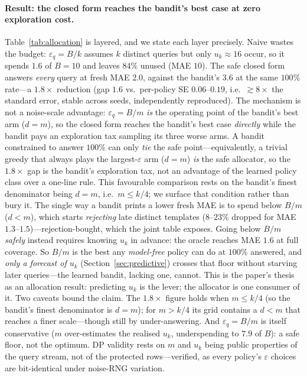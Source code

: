 \documentclass[sigconf,nonacm]{acmart}
\newcommand{\eps}{\varepsilon}
\begin{document}
\paragraph{Result: the closed form reaches the bandit's best case at zero exploration cost.} Table~\ref{tab:allocation} is layered, and we state each layer precisely. Naive wastes the budget: $\eps_q=B/k$ assumes $k$ distinct queries but only $u_k\approx16$ occur, so it spends $1.6$ of $B=10$ and leaves $84\%$ unused (MAE $10$). The safe closed form answers \emph{every} query at fresh MAE $2.0$, against the bandit's $3.6$ at the same $100\%$ rate---a $1.8\times$ reduction (gap $1.6$ vs.\ per-policy SE $0.06$--$0.19$, i.e.\ $\gtrsim8\times$ the standard error, stable across seeds, independently reproduced). The mechanism is not a noise-scale advantage: $\eps_q=B/m$ \emph{is} the operating point of the bandit's best arm ($d=m$), so the closed form reaches the bandit's best case \emph{directly} while the bandit pays an exploration tax sampling its three worse arms. A bandit constrained to answer $100\%$ can only \emph{tie} the safe point---equivalently, a trivial greedy that always plays the largest-$\eps$ arm ($d{=}m$) \emph{is} the safe allocator, so the $1.8\times$ gap is the bandit's exploration tax, not an advantage of the learned policy class over a one-line rule. This favourable comparison rests on the bandit's finest denominator being $d{=}m$, i.e.\ $m\le k/4$; we surface that condition rather than bury it. The single way a bandit prints a lower fresh MAE is to spend below $B/m$ ($d<m$), which starts \emph{rejecting} late distinct templates ($8$--$23\%$ dropped for MAE $1.3$--$1.5$)---rejection-bought, which the joint table exposes. Going below $B/m$ \emph{safely} instead requires knowing $u_k$ in advance: the oracle reaches MAE $1.6$ at full coverage. So $B/m$ is the best any \emph{model-free} policy can do at $100\%$ answered, and \emph{only a forecast of $u_k$} (Section~\ref{sec:predictive}) crosses that floor without starving later queries---the learned bandit, lacking one, cannot. This is the paper's thesis as an allocation result: predicting $u_k$ is the lever; the allocator is one consumer of it. Two caveats bound the claim. The $1.8\times$ figure holds when $m\le k/4$ (so the bandit's finest denominator is $d=m$); for $m>k/4$ its grid contains a $d<m$ that reaches a finer scale---though still by under-answering. And $\eps_q=B/m$ is itself conservative ($m$ over-estimates the realised $u_k$, underspending to $7.9$ of $B$): a safe floor, not the optimum. DP validity rests on $m$ and $u_k$ being public properties of the query stream, not of the protected rows---verified, as every policy's $\eps$ choices are bit-identical under noise-RNG variation.
\end{document}
